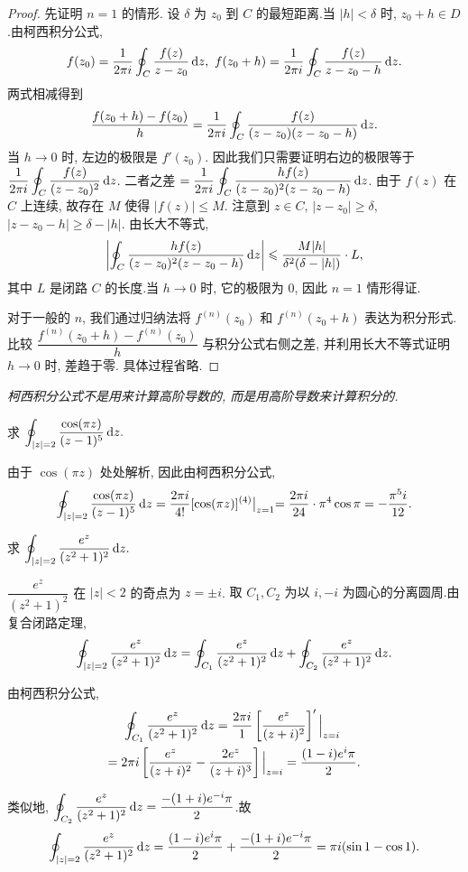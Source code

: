 \begin{proof}
	先证明 $n=1$ 的情形.
	设 $\delta$ 为 $z_0$ 到 $C$ 的最短距离.当 $|h|<\delta$ 时, $z_0+h\in D$.由柯西积分公式,
		\[f(z_0)=\frac1{2\pi i}\oint_C\frac{f(z)}{z-z_0}\diff z,\ 
		f(z_0+h)=\frac1{2\pi i}\oint_C\frac{f(z)}{z-z_0-h}\diff z.\]
	两式相减得到
		\[\frac{f(z_0+h)-f(z_0)}h=\frac1{2\pi i}\oint_C\frac{f(z)}{(z-z_0)(z-z_0-h)}\,\mathrm{d} z.\]
	当 $h\to 0$ 时, 左边的极限是 $f'(z_0)$. 因此我们只需要证明右边的极限等于 $\displaystyle\frac1{2\pi i}\oint_C\frac{f(z)}{(z-z_0)^2}\,\mathrm{d} z$.
	二者之差 $=\displaystyle\frac1{2\pi i}\oint_C\frac{h f(z)}{(z-z_0)^2(z-z_0-h)}\,\mathrm{d} z$.
	由于 $f(z)$ 在 $C$ 上连续, 故存在 $M$ 使得 $|f(z)|\le M$. 注意到 $z\in C$, $|z-z_0|\ge \delta$, $|z-z_0-h|\ge\delta-|h|$. 由长大不等式,
		\[\left|\oint_C\frac{h f(z)}{(z-z_0)^2(z-z_0-h)}\,\mathrm{d} z\right|\leqslant\frac{M|h|}{\delta^2(\delta-|h|)}\cdot L,\]
	其中 $L$ 是闭路 $C$ 的长度.当 $h\to0$ 时, 它的极限为 $0$, 因此 $n=1$ 情形得证.

	对于一般的 $n$, 我们通过归纳法将 $f^{(n)}(z_0)$ 和 $f^{(n)}(z_0+h)$ 表达为积分形式. 比较 $\dfrac{f^{(n)}(z_0+h)-f^{(n)}(z_0)}h$ 与积分公式右侧之差, 并利用长大不等式证明 $h\to 0$ 时, 差趋于零. 具体过程省略.
\end{proof}

\emph{柯西积分公式不是用来计算高阶导数的, 而是用高阶导数来计算积分的.}

\begin{example}
	求 $\displaystyle\oint_{|z|=2}\frac{\cos(\pi z)}{(z-1)^5}\,\mathrm{d} z.$
\end{example}

\begin{solution}
	由于 $\cos(\pi z)$ 处处解析,
	{因此由柯西积分公式,
		\[
		\oint_{|z|=2}\frac{\cos(\pi z)}{(z-1)^5}\,\mathrm{d} z
		=\frac{2\pi i}{4!}[\cos(\pi z)]^{(4)}\big|_{z=1}
		{=\frac{2\pi i}{24}\cdot \pi^4\cos \pi=-\frac{\pi^5 i}{12}.}
		\]}
\end{solution}

\begin{example}
	求 $\displaystyle\oint_{|z|=2}\frac{e^z}{(z^2+1)^2}\,\mathrm{d} z.$
\end{example}

\begin{solution}
	$\dfrac{e^z}{(z^2+1)^2}$ 在 $|z|<2$ 的奇点为 $z=\pm i$.
	{取 $C_1,C_2$ 为以 $i,-i$ 为圆心的分离圆周.由复合闭路定理,
		\[\oint_{|z|=2}\frac{e^z}{(z^2+1)^2}\,\mathrm{d} z
		=\oint_{C_1}\frac{e^z}{(z^2+1)^2}\,\mathrm{d} z
		+\oint_{C_2}\frac{e^z}{(z^2+1)^2}\,\mathrm{d} z.\]}

	由柯西积分公式,
		\begin{align*}
		&\peq\oint_{C_1}\frac{e^z}{(z^2+1)^2}\diff z
		=\frac{2\pi i}{1}\left[\frac{e^z}{(z+i)^2}\right]'\Big|_{z=i}\\
		&{=2\pi i\left[\frac{e^z}{(z+i)^2}-\frac{2e^z}{(z+i)^3}\right]\Big|_{z=i}
		=\frac{(1-i)e^i\pi}2.}
		\end{align*}

	{类似地, $\displaystyle\oint_{C_2}\frac{e^z}{(z^2+1)^2}\,\mathrm{d} z=\frac{-(1+i)e^{-i}\pi}2$.故
		\[\oint_{|z|=2}\frac{e^z}{(z^2+1)^2}\,\mathrm{d} z
		=\frac{(1-i)e^i\pi}2+\frac{-(1+i)e^{-i}\pi}2
		=\pi i(\sin1-\cos1).\]}
\end{solution}


